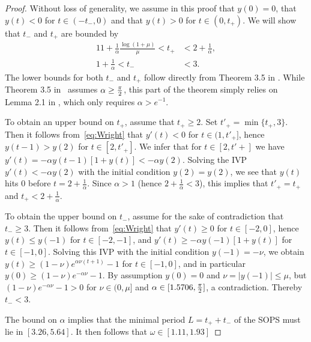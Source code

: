 \begin{proof}
	Without loss of generality, we assume in this proof that $ y(0) =0$, that $y(t) < 0$ for $t\in (-t_{-},0)$ and that $y(t) > 0$ for $t\in (0,t_+)$. 
	We will show that $t_-$ and $t_+$ are bounded by
	\begin{alignat*}{1}
	1+ \frac{1}{\alpha }  \frac{\log (1 + \mu)}{\mu}  < t_+ &<2 + \frac{1}{\alpha} , \\
	1+\frac{1}{\alpha} <t_- & < 3 .
	\end{alignat*}
	The lower bounds for both $t_-$ and $t_+$ follow directly from  Theorem 3.5 in \cite{jones1962nonlinear}. While Theorem 3.5 in~\cite{jones1962nonlinear} assumes $ \alpha \geq \tfrac{\pi}{2}$, this part of the theorem simply relies on Lemma 2.1 in \cite{jones1962nonlinear}, which only requires $ \alpha > e^{-1}$.
	

To obtain an upper bound on $t_+$, assume that $ t_+ \geq 2$. Set $t'_+ =\min\{t_+,3\}$. Then it follows from~\eqref{eq:Wright} that $y'(t) < 0$ for $t\in (1,t'_+]$, hence  $y(t-1) > y(2)$ for $ t \in [2,t'_+]$. We infer that for $t \in [2,t'+]$ we have 
$y'(t) = - \alpha y(t-1) [1+y(t)] < - \alpha y(2)$.
Solving the IVP $y'(t) < -\alpha y(2)$ with the initial condition $y(2) = y(2)$, we see that $y(t)$ hits $0$ before $t=2+\frac{1}{\alpha}$. Since $\alpha > 1$ (hence $2+\frac{1}{\alpha} < 3$), this implies that $t'_+=t_+$ and $t_+ < 2+\frac{1}{\alpha}$.
 
	

	To obtain the upper bound on $t_-$, assume for the sake of contradiction
	 that $ t_- \geq 3$. 
	 Then it follows from~\eqref{eq:Wright} that $y'(t) \geq 0$ for $t\in [-2,0]$, hence  $y(t) \leq y(-1)$ for $ t \in [-2,-1]$, and  $y'(t) \geq - \alpha y(-1) [1+y(t)]$ for $ t \in [-1,0]$.  
	Solving this IVP with the initial condition $y(-1) = -\nu$, we obtain $ y(t) \geq (1-\nu) e^{ \alpha \nu (t+1)}-1 $ for $ t \in [-1,0]$, and in particular  $y(0) \geq (1-\nu ) e^{-\alpha \nu}-1$. 
	By assumption $y(0)=0$ and $\nu=|y(-1)| \leq \mu$,
	but $  (1-\nu ) e^{-\alpha \nu}-1>0 $ 
	for $ \nu  \in (0,\mu]$
	and $\alpha \in [1.5706,\tfrac{\pi}{2}]$, a contradiction. Thereby $ t_- <3$. 


The bound on $\alpha$ implies that 
 the minimal period $L = t_+ + t_-$ of the SOPS must lie in $[ 3.26,5.64]$.
It then follows that $ \omega \in [1.11,1.93]$	
\end{proof}

%


